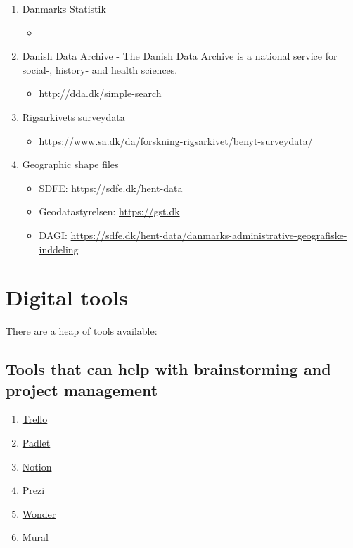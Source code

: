 \documentclass[
]{book}
\providecommand{\tightlist}{%
  \setlength{\itemsep}{0pt}\setlength{\parskip}{0pt}}
\begin{document}
\begin{enumerate}
\def\labelenumi{\arabic{enumi}.}
\tightlist
\item
  Danmarks Statistik

  \begin{itemize}
  \tightlist
  \item
  \end{itemize}
\item
  Danish Data Archive - The Danish Data Archive is a national service for social-, history- and health sciences.

  \begin{itemize}
  \tightlist
  \item
    \url{http://dda.dk/simple-search}
  \end{itemize}
\item
  Rigsarkivets surveydata

  \begin{itemize}
  \tightlist
  \item
    \url{https://www.sa.dk/da/forskning-rigsarkivet/benyt-surveydata/}
  \end{itemize}
\item
  Geographic shape files

  \begin{itemize}
  \tightlist
  \item
    SDFE: \url{https://sdfe.dk/hent-data}
  \item
    Geodatastyrelsen: \url{https://gst.dk}
  \item
    DAGI: \url{https://sdfe.dk/hent-data/danmarks-administrative-geografiske-inddeling}
  \end{itemize}
\end{enumerate}

\hypertarget{digital-tools}{%
\chapter{Digital tools}\label{digital-tools}}

There are a heap of tools available:

\hypertarget{tools-that-can-help-with-brainstorming-and-project-management}{%
\section{Tools that can help with brainstorming and project management}\label{tools-that-can-help-with-brainstorming-and-project-management}}

\begin{enumerate}
\def\labelenumi{\arabic{enumi}.}
\tightlist
\item
  \href{https://trello.com/en}{Trello}
\item
  \href{https://padlet.com}{Padlet}
\item
  \href{https://www.notion.so}{Notion}
\item
  \href{https://prezi.com}{Prezi}
\item
  \href{https://www.wonder.me}{Wonder}
\item
  \href{https://www.mural.co}{Mural}
\end{enumerate}
\end{document}
